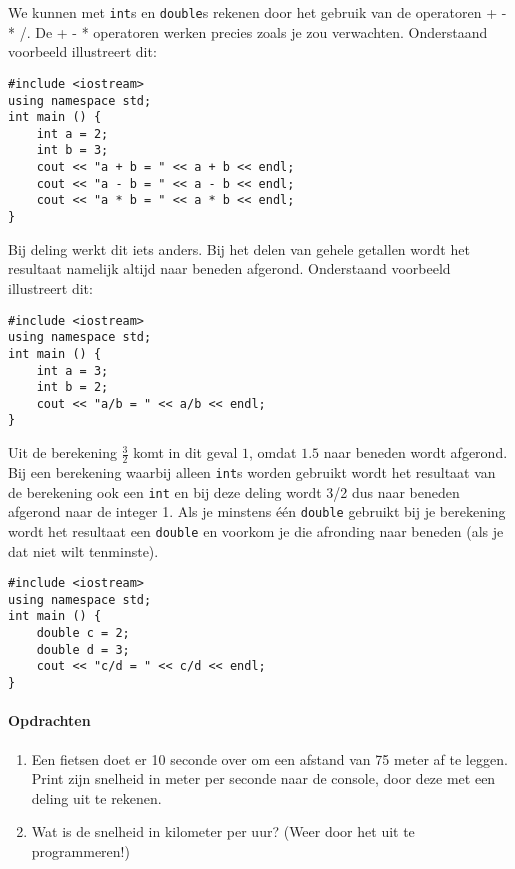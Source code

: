 \documentclass[12pt,a4paper]{article}
\newcommand{\icode}{\lstinline}
\begin{document}
We kunnen met \icode{int}s en \icode{double}s rekenen door het gebruik van de operatoren + - * /. 
De + - * operatoren werken precies zoals je zou verwachten. Onderstaand voorbeeld illustreert dit: 
\begin{lstlisting}
#include <iostream> 
using namespace std; 
int main () {
	int a = 2; 
	int b = 3; 
	cout << "a + b = " << a + b << endl; 
	cout << "a - b = " << a - b << endl; 
	cout << "a * b = " << a * b << endl; 
}
\end{lstlisting}
Bij deling werkt dit iets anders. Bij het delen van gehele getallen wordt het resultaat namelijk altijd naar beneden afgerond. 
Onderstaand voorbeeld illustreert dit: 
\begin{lstlisting}
#include <iostream> 
using namespace std; 
int main () {
	int a = 3; 
	int b = 2; 
	cout << "a/b = " << a/b << endl; 
}
\end{lstlisting}
Uit de berekening $\frac 32$ komt in dit geval $1$, omdat $1.5$ naar beneden wordt afgerond. Bij een 
berekening waarbij alleen \icode{int}s worden gebruikt wordt het resultaat van de berekening ook 
een \icode{int} en bij deze deling wordt 3/2 dus naar beneden afgerond naar de integer 1. Als je minstens 
één \icode{double} gebruikt bij je berekening wordt het resultaat een \icode{double} en voorkom je 
die afronding naar beneden (als je dat niet wilt tenminste). 
\begin{lstlisting}
#include <iostream> 
using namespace std; 
int main () {
	double c = 2; 
	double d = 3; 
	cout << "c/d = " << c/d << endl; 
}
\end{lstlisting}

\paragraph{Opdrachten}
\begin{enumerate}
\item
	Een fietsen doet er 10 seconde over om een afstand van 75 meter af te leggen. Print zijn snelheid in meter per seconde naar de console, door deze met een deling uit te rekenen.
\item 
	Wat is de snelheid in kilometer per uur? (Weer door het uit te programmeren!)
\end{enumerate} 
\end{document}
